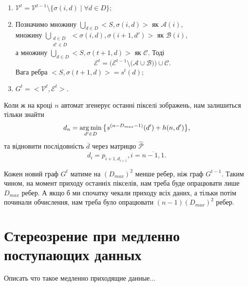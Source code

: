 \begin{enumerate}
	\item 
		$\mathcal{V}^t = \mathcal{V}^{t-1} \setminus \{ \sigma(i, d) \; | \; \forall d \in D \};$\\
	\item %
		Позначимо множину $ \bigcup\limits_{d \in D} <S, \sigma(i, d) > $ як $ \mathcal{A}(i),$ \\
		множину $ \bigcup\limits_{\substack{d \in D \\ d' \in D}} <\sigma(i, d), \sigma(i+1, d') > $ як $ \mathcal{B}(i),$ \\
		а множину $ \bigcup\limits_{d \in D} <S, \sigma(t+1, d) > $ як $ \mathcal{C}. $ Тоді 
		$$\mathcal{E}^t = \Big( \mathcal{E}^{t-1} \setminus \big( \mathcal{A} \cup \mathcal{B} \big) \Big) \cup \mathcal{C}.$$
		Вага ребра $ <S, \sigma(t+1, d) > = s^t(d);$ %
	\item 
		$G^t = <\mathcal{V}^t, \mathcal{E}^t>.$ \\
\end{enumerate}

Коли ж на кроці $ n $ автомат згенерує останні пікселі зображень, нам залишиться тільки знайти
$$ d_n = \operatorname*{arg\,min}\limits_{d' \in D} \big\{ { s^{(n-D_{max}-1)}(d') + h(n, d') } \big\},$$
та відновити послідовність $\overline{d}$ через матрицю $\hat{\mathcal{P}}$
$$ d_i = p_{i+1,d_{i+1}}, i = \overline{n-1, 1}. $$

Кожен новий граф $G^t$ матиме на $(D_{max})^2$ менше ребер, ніж граф $G^{t-1}$. Таким чином, на момент приходу останніх пікселів, нам треба буде опрацювати лише $D_{max}$ ребер. А якщо б ми спочатку чекали приходу всіх даних, а тільки потім починали обчислення, нам треба було опрацювати 
$(n-1)(D_{max})^2$ ребер.










\section{Стереозрение при медленно поступающих данных}
Описать что такое медленно приходящие данные...

